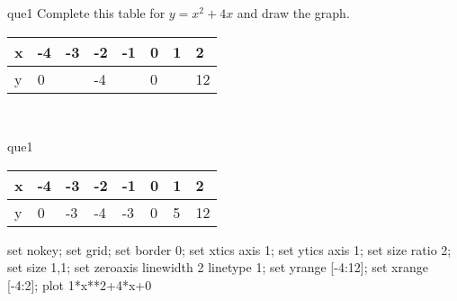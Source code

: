 \documentclass[13.5pt, varwidth=true]{beamer}
\begin{document}
\begin{frame}[shrink=19,fragile]
	\begin{beamercolorbox}[rounded=true, left, shadow=true,wd=14.8cm]{que1}
		 Complete this table for $y = x^{2} + 4x$ and draw the graph. \\[0.3cm] \renewcommand{\arraystretch}{1.2}\begin{tabular}{|C|C|C|C|C|C|C|C|} \hline x & -4 & -3 & -2 & -1 & 0 & 1 & 2 \\ \hline y & 0 &  & -4 &  & 0 &  & 12\\ \hline \end{tabular}\\[0.3cm]
	\end{beamercolorbox}
\end{frame}
\begin{frame}[shrink=19,fragile]
	\begin{beamercolorbox}[rounded=true, left, shadow=true,wd=14.8cm]{que1}
		\renewcommand{\arraystretch}{1.2}\begin{tabular}{|C|C|C|C|C|C|C|C|} \hline x & -4 & -3 & -2 & -1 & 0 & 1 & 2 \\ \hline y & 0 & -3 & -4 & -3 & 0 & 5 & 12\\ \hline \end{tabular}\begin{gnuplot}[terminal=pdf] set nokey; set grid; set border 0; set xtics axis 1; set ytics axis 1; set size ratio 2; set size 1,1; set zeroaxis linewidth 2 linetype 1; set yrange [-4:12]; set xrange [-4:2]; plot 1*x**2+4*x+0 \end{gnuplot}
	\end{beamercolorbox}
\end{frame}
\end{document}
